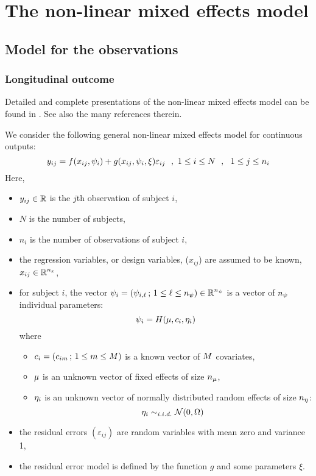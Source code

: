 \section{The non-linear mixed effects model} \label{sec:models}

\subsection{Model for the observations} \label{sec:longitudinal}

\subsubsection{Longitudinal outcome} \label{sec:longitudinalCont}

Detailed and complete presentations of the non-linear mixed effects model can be found in \cite{Davidian95, davgil1, PinheiroBates00}. See also the many references therein.

We consider the following general non-linear mixed effects model for continuous outputs:
\begin{equation}
\label{nlme}
y_{ij}=f(x_{ij},\psigi)+ g(x_{ij},\psigi,\xi)\varepsilon_{ij} \ \ , \ 1\leq i \leq N \ \ ,
\ \ 1 \leq j \leq n_i
\end{equation}
Here,
\begin{itemize}
\item $y_{ij}\in \mbox{$\mathbb{R}$}$ is the $j$th observation of subject $i$,
\item $N$ is the number of subjects,
\item $n_i$ is the number of observations of subject $i$,
\item the regression variables, or design variables, ($x_{ij}$) are assumed to be known, $x_{ij}\in
\mbox{$\mathbb{R}$}^{n_x}$,
\item for subject $i$, the vector ${\psi_i}=({\psi_{i,\ell}} \, ; \, 1\leq \ell \leq {n_\psi}) \in \mbox{$\mathbb{R}$}^{n_\psi}$ is a vector of ${n_\psi}$ individual parameters:
\begin{equation} \label{prior}
\psigi=H(\fixed_effect,\covariate_i,\etagi)
\end{equation}
where
\begin{itemize}
\item $c_i =(c_{im} \, ; \, 1\leq m \leq M)$ is a known vector of $M$ covariates,
\item $\fixed_effect$ is an unknown vector of fixed effects of size $\nbeta$,
\item ${\eta_i}$ is an unknown vector of normally distributed random effects of size ${n_\eta}$: 
$${\eta_i} \sim_{i.i.d.} {\cal N}(0,{\Omega})$$
\end{itemize}
\item the residual errors $(\varepsilon_{ij})$  are random variables with mean zero and variance 1,
\item the residual error model is defined by the function $g$ and some parameters $\xi$.
\end{itemize}

